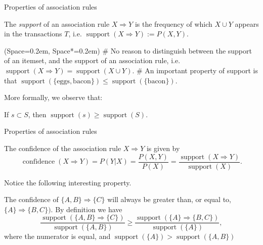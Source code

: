 \documentclass[12pt, aspectratio=1610]{beamer}
\newcommand{\listSpace}{0.2em}
\theoremstyle{plain}
\begin{document}
\begin{frame}[fragile]{Properties of association rules}
	\begin{definition}[Support]
		The \emph{support} of an association rule $X \Rightarrow Y$ is the frequency of which $X \cup Y$ appears in the transactions $T$, i.e. $ \operatorname{support}(X \Rightarrow Y) := P(X, Y)$.
	\end{definition}
	
	\begin{easylist}[itemize]
		\ListProperties(Space=\listSpace, Space*=\listSpace)
		# No reason to distinguish between the support of an itemset, and the support of an association rule, i.e. $\operatorname{support}(X \Rightarrow Y) = \operatorname{support}(X \cup Y)$.
		# An important property of support is that $\operatorname{support}(\{ \text{eggs}, \text{bacon} \}) \leq \operatorname{support}(\{ \text{bacon} \})$.
		
	\end{easylist}
	\vspace*{1em}
	More formally, we observe that:
	\begin{theorem}
		If $s \subset S$, then $\operatorname{support}(s) \geq \operatorname{support}(S)$.
	\end{theorem}

\end{frame}


\begin{frame}[fragile]{Properties of association rules}
	\small 
	\begin{definition}[Confidence]
		The confidence of the association rule $X \Rightarrow Y$ is given by 
		\begin{equation*}
		\operatorname{confidence}(X \Rightarrow Y) = P(Y | X) = \frac{P(X, Y) }{P(X) } = \frac{\operatorname{support}(X \Rightarrow Y)}{\operatorname{support}(X)}.
		\end{equation*}
	\end{definition}
	
	Notice the following interesting property.
	\begin{example}
		The confidence of $\{A, B\} \Rightarrow \{C\}$ will always be greater than, or equal to, $\{A\} \Rightarrow \{B, C\})$.
		By definition we have
		\begin{equation*}
		\frac{\operatorname{support}(\{A, B\} \Rightarrow \{C\})}{\operatorname{support}(\{A, B\})}
		\geq 
		\frac{\operatorname{support}(\{A\} \Rightarrow \{B, C\})}{\operatorname{support}(\{A\})},
		\end{equation*}
		where the numerator is equal, and $\operatorname{support}(\{A\}) > \operatorname{support}(\{A, B\})$  
	\end{example}
	\normalsize
	
\end{frame}
\end{document}
